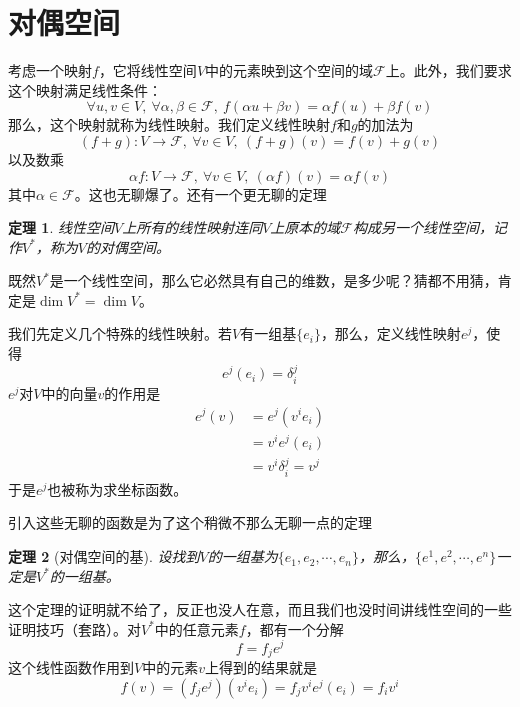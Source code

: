 \documentclass[a4paper,11pt]{ctexart}
\newcommand{\beq}{\begin{equation}}
\newcommand{\eeq}{\end{equation}}
\newcommand{\bea}{\begin{equation}\begin{aligned}}
\newcommand{\eea}{\end{aligned}\end{equation}}
\newcommand{\field}{\mathscr{F}}
\newtheorem{thm}{定理}[section]
\begin{document}
\section{对偶空间}
考虑一个映射$f$，它将线性空间$V$中的元素映到这个空间的域$\field$上。此外，我们要求这个映射满足线性条件：
\beq
\forall u,v \in V, \ \forall \alpha, \beta \in \field,\ f(\alpha u + \beta v) = \alpha f(u) + \beta f(v)
\eeq
那么，这个映射就称为线性映射。我们定义线性映射$f$和$g$的加法为
\beq
(f+g): V\to \field,\ \forall v \in V,\  (f+g)(v)= f(v) + g(v)
\eeq
以及数乘
\beq
\alpha f: V \to \field,\ \forall v\in V,\ (\alpha f)(v) = \alpha f(v)
\eeq
其中$\alpha \in \field$。这也无聊爆了。还有一个更无聊的定理
\begin{thm}\par
线性空间$V$上所有的线性映射连同$V$上原本的域$\field$构成另一个线性空间，记作$V^*$，称为$V$的对偶空间。
\end{thm}
既然$V^*$是一个线性空间，那么它必然具有自己的维数，是多少呢？猜都不用猜，肯定是$\dim V^* = \dim V$。
\par
我们先定义几个特殊的线性映射。若$V$有一组基$\{e_i\}$，那么，定义线性映射$e^j$，使得
\beq
e^j(e_i) = \delta_i^j
\eeq
$e^j$对$V$中的向量$v$的作用是
\bea
e^j(v) &= e^j(v^i e_i) \\
&= v^i e^j(e_i) \\
&= v^i \delta_i^j = v^j
\eea
于是$e^j$也被称为求坐标函数。
\par
引入这些无聊的函数是为了这个稍微不那么无聊一点的定理
\begin{thm}[对偶空间的基]\par
设找到$V$的一组基为$\{e_1,e_2,\cdots,e_n\}$，那么，$\{e^1,e^2,\cdots,e^n\}$一定是$V^*$的一组基。
\end{thm}
这个定理的证明就不给了，反正也没人在意，而且我们也没时间讲线性空间的一些证明技巧（套路）。对$V^*$中的任意元素$f$，都有一个分解
\beq
f = f_j e^j
\eeq
这个线性函数作用到$V$中的元素$v$上得到的结果就是
\beq
f(v)= (f_j e^j) (v^i e_i) = f_j v^i e^j(e_i) = f_i v^i
\eeq
\end{document}
